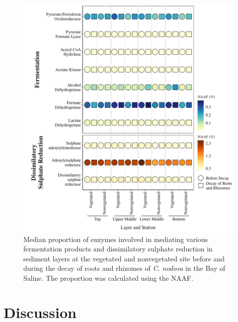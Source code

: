 \documentclass[
  12 pt,
]{article}
\begin{document}
\begin{figure}[H]

{\centering \includegraphics[width=0.9\linewidth]{../results/figures/heatmap_fermentation_dsr} 

}

\caption{Median proportion of enzymes involved in mediating various fermentation products and dissimilatory sulphate reduction in sediment layers at the vegetated and nonvegetated site before and during the decay of roots and rhizomes of \emph{C. nodosa} in the Bay of Saline. The proportion was calculated using the NAAF.}\label{fig:heatmap-fermentation-dsr}
\end{figure}

\newpage

\hypertarget{discussion}{%
\section{Discussion}\label{discussion}}
\end{document}
